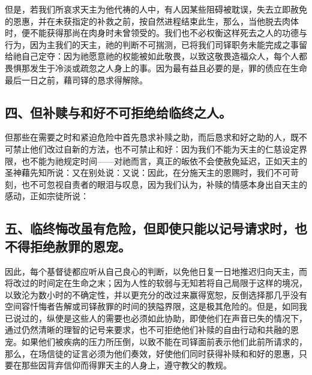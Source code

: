 但是，若我们所哀求天主为他代祷的人中，有人因某些阻碍被耽误，失去立即赦免的恩惠，并在未获指定的补救之前，按自然进程结束此生，那么，当他脱去肉体时，便不能获得那尚在肉身时未曾领受的。我们也不必权衡这样死去之人的功德与行为，因为主我们的天主，祂的判断不可揣测，已将我们司铎职务未能完成之事留给祂自己定夺：因为祂愿意祂的权能被如此敬畏，以致这敬畏造福众人，每个人都畏惧那发生于冷淡或疏忽之人身上的事。因为最有益且必要的是，罪的债应在生命最后一日之前，藉司铎的恳求得解除。\par


\subsection{四、但补赎与和好不可拒绝给临终之人。}

但那些在需要之时和紧迫危险中首先恳求补赎之助，而后恳求和好之助的人，既不可禁止他们改过自新的方法，也不可禁止和好：因为我们不能为天主的仁慈设定界限，也不能为祂规定时间——对祂而言，真正的皈依不会使赦免延迟，正如天主的圣神藉先知所说：又在别处说：又说：因此，在分施天主的恩赐时，我们不可苛刻，也不可忽视自责者的眼泪与叹息，因为我们认为，补赎的情感本身出自天主的感动，正如宗徒所说：\par


\subsection{五、临终悔改虽有危险，但即使只能以记号请求时，也不得拒绝赦罪的恩宠。}

因此，每个基督徒都应听从自己良心的判断，以免他日复一日地推迟归向天主，而将改过的时间定在生命之末；因为人性的软弱与无知若将自己局限于这样的境况，以致沦为数小时的不确定性，并以更充分的改过来赢得宽恕，反倒选择那几乎没有空间容忏悔者告解或司铎赦罪的时间的狭隘界限，这是极其危险的。但是，如同我已说过的，纵使是这些人的需要也必须如此协助，即使他们在声音已失的情况下，通过仍然清晰的理智的记号来要求，也不可拒绝他们补赎的自由行动和共融的恩宠。如果他们被疾病的压力所压倒，以致不能在司铎面前表示他们此前所请求的，那么，在场信徒的证言必须为他们奏效，好使他们同时获得补赎和和好的恩惠，只要在那些因背弃信仰而得罪天主的人身上，遵守教父的教规。\par

